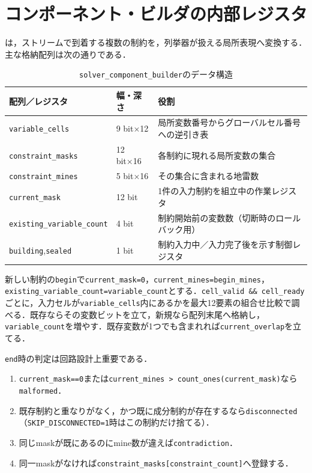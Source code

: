 \section{コンポーネント・ビルダの内部レジスタ}
\label{sec:component-builder}

は，ストリームで到着する複数の制約を，列挙器が扱える局所表現へ変換する．主な格納配列は次の通りである．

\begin{table}[tb]
\centering
\caption{\texttt{solver\_component\_builder}のデータ構造}
\label{tab:builder-registers}
\begin{tabularx}{\linewidth}{llX}
\toprule
配列／レジスタ & 幅・深さ & 役割\\
\midrule
\texttt{variable\_cells} & 9 bit×12 & 局所変数番号からグローバルセル番号への逆引き表\\
\texttt{constraint\_masks} & 12 bit×16 & 各制約に現れる局所変数の集合\\
\texttt{constraint\_mines} & 5 bit×16 & その集合に含まれる地雷数\\
\texttt{current\_mask} & 12 bit & 1件の入力制約を組立中の作業レジスタ\\
\texttt{existing\_variable\_count} & 4 bit & 制約開始前の変数数（切断時のロールバック用）\\
\texttt{building},\texttt{sealed} & 1 bit & 制約入力中／入力完了後を示す制御レジスタ\\
\bottomrule
\end{tabularx}
\end{table}

新しい制約の\texttt{begin}で\texttt{current\_mask=0}，\texttt{current\_mines=begin\_mines}，\texttt{existing\_variable\_count=variable\_count}とする．\texttt{cell\_valid \&\& cell\_ready}ごとに，入力セルが\texttt{variable\_cells}内にあるかを最大12要素の組合せ比較で調べる．既存ならその変数ビットを立て，新規なら配列末尾へ格納し，\texttt{variable\_count}を増やす．既存変数が1つでも含まれれば\texttt{current\_overlap}を立てる．

\texttt{end}時の判定は回路設計上重要である．
\begin{enumerate}
  \item \texttt{current\_mask==0}または\texttt{current\_mines > count\_ones(current\_mask)}なら\texttt{malformed}．
  \item 既存制約と重なりがなく，かつ既に成分制約が存在するなら\texttt{disconnected}（\texttt{SKIP\_DISCONNECTED=1}時はこの制約だけ捨てる）．
  \item 同じmaskが既にあるのにmine数が違えば\texttt{contradiction}．
  \item 同一maskがなければ\texttt{constraint\_masks[constraint\_count]}へ登録する．
\end{enumerate}

